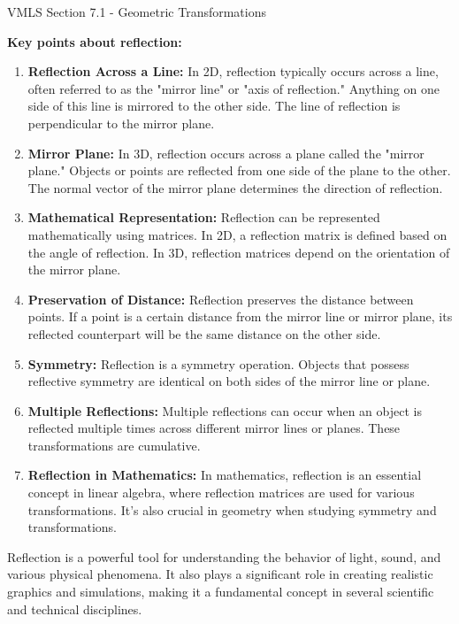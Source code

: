 \begin{notes}{VMLS Section 7.1 - Geometric Transformations}
\begin{Highlight}
    \end{Highlight}
    
    \textbf{Key points about reflection:}
    
    \begin{enumerate}
        \item \textbf{Reflection Across a Line:} In 2D, reflection typically occurs across a line, often referred to as the "mirror line" or "axis of reflection." Anything on one side of this line is 
        mirrored to the other side. The line of reflection is perpendicular to the mirror plane.
    
        \item \textbf{Mirror Plane:} In 3D, reflection occurs across a plane called the "mirror plane." Objects or points are reflected from one side of the plane to the other. The normal vector of 
        the mirror plane determines the direction of reflection.
    
        \item \textbf{Mathematical Representation:} Reflection can be represented mathematically using matrices. In 2D, a reflection matrix is defined based on the angle of reflection. In 3D, reflection 
        matrices depend on the orientation of the mirror plane.
    
        \item \textbf{Preservation of Distance:} Reflection preserves the distance between points. If a point is a certain distance from the mirror line or mirror plane, its reflected counterpart will 
        be the same distance on the other side.
    
        \item \textbf{Symmetry:} Reflection is a symmetry operation. Objects that possess reflective symmetry are identical on both sides of the mirror line or plane.
    
        \item \textbf{Multiple Reflections:} Multiple reflections can occur when an object is reflected multiple times across different mirror lines or planes. These transformations are cumulative.
    
        \item \textbf{Reflection in Mathematics:} In mathematics, reflection is an essential concept in linear algebra, where reflection matrices are used for various transformations. It's also crucial 
        in geometry when studying symmetry and transformations.
    
    \end{enumerate}
    
    Reflection is a powerful tool for understanding the behavior of light, sound, and various physical phenomena. It also plays a significant role in creating realistic graphics and simulations, making 
    it a fundamental concept in several scientific and technical disciplines.
\end{notes}

